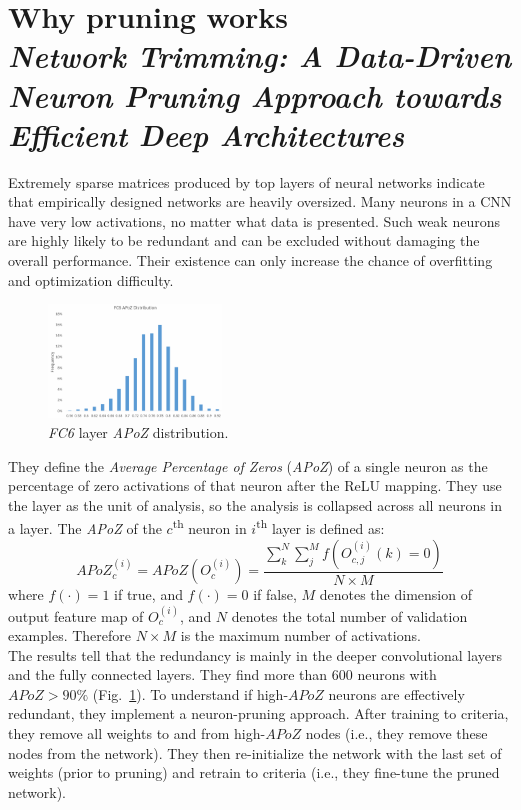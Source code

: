 \section[Why pruning works]{Why pruning works\\ \textit{Network Trimming: A Data-Driven Neuron Pruning Approach towards Efficient Deep Architectures}\\ }
Extremely sparse matrices produced by top layers of neural networks indicate that empirically designed networks are heavily oversized. Many neurons in a CNN have very low activations, no matter what data is presented. Such weak neurons are highly likely to be redundant and can be excluded without damaging the overall performance. Their existence can only increase the chance of overfitting and optimization difficulty.

\begin{figure}
  \centering
  \includegraphics[width=0.41\textwidth]{images/apoz.png}
  \caption{\textit{FC6} layer \textit{APoZ} distribution.}
  \label{fig:apoz}
\end{figure}

They define the \textit{Average Percentage of Zeros} (\textit{APoZ}) of a single neuron as the percentage of zero activations of that neuron after the ReLU mapping. They use the layer as the unit of analysis, so the analysis is collapsed across all neurons in a layer. The \textit{APoZ} of the $c$\textsuperscript{th} neuron in $i$\textsuperscript{th} layer is defined as:
\[
APoZ_c^{(i)} = APoZ(O_c^{(i)}) = \frac{\sum_k^N \sum_j^M f(O_{c,j}^{(i)}(k)=0)}{N\times M}
\]
where $f(\cdot) = 1$ if true, and $f(\cdot) = 0$ if false, $M$ denotes the dimension of output feature map of $O_c^{(i)}$, and $N$ denotes the total number of validation examples. Therefore $N\times M$ is the maximum number of activations.\\

The results tell that the redundancy is mainly in the deeper convolutional layers and the fully connected layers. They find more than 600 neurons with $APoZ > 90\%$ (Fig.~\ref{fig:apoz}).
To understand if high-$APoZ$ neurons are effectively redundant, they implement a neuron-pruning approach. After training to criteria, they remove all weights to and from high-$APoZ$ nodes (i.e., they remove these nodes from the network). They then re-initialize the network with the last set of weights (prior to pruning) and retrain to criteria (i.e., they fine-tune the pruned network).

